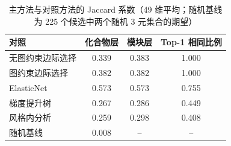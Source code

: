 \begin{table}[htbp]
\centering
\caption{主方法与对照方法的 Jaccard 系数（49 维平均；随机基线为 225 个候选中两个随机 3 元集合的期望）}\label{tab:q2_jaccard}
\begin{tabular}{lccc}
\toprule
对照 & 化合物层 & 模块层 & Top-1 相同比例 \\
\midrule
无图约束边际选择 & 0.339 & 0.383 & 1.000 \\
图约束边际选择 & 0.382 & 0.382 & 1.000 \\
ElasticNet & 0.573 & 0.573 & 0.755 \\
梯度提升树 & 0.267 & 0.286 & 0.449 \\
风格内分析 & 0.259 & 0.298 & 0.408 \\
随机基线 & 0.008 & -- & -- \\
\bottomrule
\end{tabular}
\end{table}
